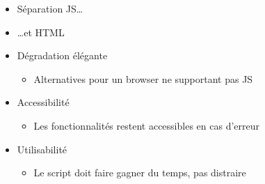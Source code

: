 \begin{itemize}
\tightlist
\item
  Séparation JS\ldots{}
\end{itemize}

\begin{otherlanguage}{english}

\begin{Shaded}
\begin{Highlighting}[]
\NormalTok{(}\OperatorTok{,} \NormalTok{() }\OperatorTok{\{}
    \NormalTok{(}\NormalTok{(}\OperatorTok{,}\OperatorTok{;}
\OperatorTok{\};}
\end{Highlighting}
\end{Shaded}

\end{otherlanguage}

\begin{itemize}
\tightlist
\item
  \ldots{}et HTML
\end{itemize}

\begin{otherlanguage}{english}

\begin{Shaded}
\begin{Highlighting}[]
     \KeywordTok{/>}
\end{Highlighting}
\end{Shaded}

\end{otherlanguage}

\begin{itemize}
\tightlist
\item
  Dégradation élégante

  \begin{itemize}
  \tightlist
  \item
    Alternatives pour un browser ne supportant pas JS
  \end{itemize}
\item
  Accessibilité

  \begin{itemize}
  \tightlist
  \item
    Les fonctionnalités restent accessibles en cas d'erreur
  \end{itemize}
\item
  Utilisabilité

  \begin{itemize}
  \tightlist
  \item
    Le script doit faire gagner du temps, pas distraire
  \end{itemize}
\end{itemize}

